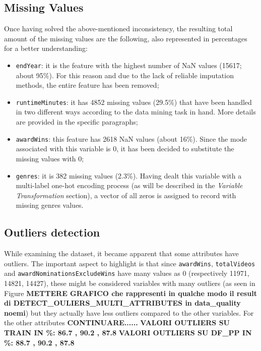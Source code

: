 \subsection{Missing Values}
Once having solved the above-mentioned inconsistency, the resulting total amount of the missing values are the following, also represented in percentages for a better understanding:
\begin{itemize}
    \item \texttt{endYear}: it is the feature with the highest number of NaN values (15617; about 95\%). For this reason and due to the lack of reliable imputation methods, the entire feature has been removed;
    
    \item \texttt{runtimeMinutes}: it has 4852 missing values (29.5\%) that have been handled in two different ways according to the data mining task in hand. More details are provided in the specific paragraphs;
    
    \item \texttt{awardWins}: this feature has 2618 NaN values (about 16\%). Since the mode associated with this variable is 0, it has been decided to substitute the missing values with 0;

    \item \texttt{genres}: it is 382 missing values (2.3\%). Having dealt this variable with a multi-label one-hot encoding process (as will be described in the \textit{Variable Transformation} section), a vector of all zeros is assigned to record with missing genres values.
\end{itemize}



\subsection{Outliers detection}
While examining the dataset, it became apparent that some attributes have outliers. 
The important aspect to highlight is that since \texttt{awardWins}, \texttt{totalVideos} and \texttt{awardNominationsExcludeWins} have many values as 0 (respectively 11971, 14821, 14427), 
these might be considered variables with many outliers (as seen in Figure \textbf{METTERE GRAFICO che rappresenti in qualche modo il result di DETECT\_OULIERS\_MULTI\_ATTRIBUTES in data\_quality noemi}) but they actually have less outliers compared to the other variables.
For the other attributes \textbf{CONTINUARE......}
\textbf{VALORI OUTLIERS SU TRAIN IN \%: 86.7 , 90.2 , 87.8}
\textbf{VALORI OUTLIERS SU DF\_PP IN \%: 88.7 , 90.2 , 87.8}


